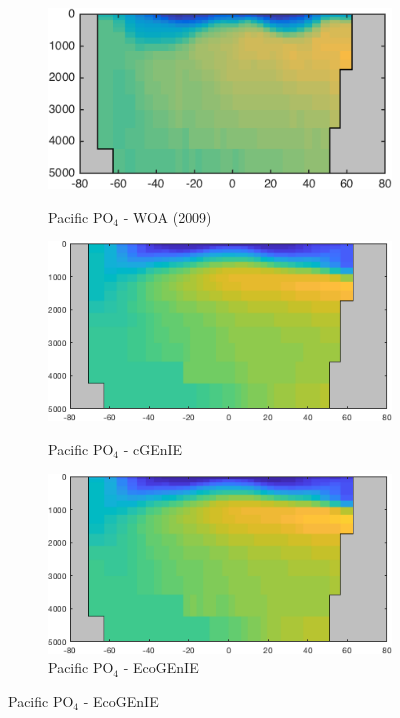 \documentclass{article}
\begin{document}
\begin{figure}[htp]
\begin{subfigure}{.33\textwidth}
 \label{fig:nutrients2}
\end{subfigure}
\begin{subfigure}{.33\textwidth}
 \caption{Pacific PO$_4$ - WOA (2009)}
 \includegraphics[width=0.95\linewidth]{../Separate_figures/OBSERVATIONS/Pacific_p_an_profile.png}
 \label{fig:nutrients1}
\end{subfigure}%
\begin{subfigure}{.33\textwidth}
 \caption{Pacific PO$_4$ - cGEnIE}
 \includegraphics[width=0.95\linewidth]{../Separate_figures/BIOGEM/Pacific_ocn_PO4_profile.png}
 \label{fig:nutrients1}
\end{subfigure}%
\begin{subfigure}{.33\textwidth}
 \caption{Pacific PO$_4$ - EcoGEnIE}
 \includegraphics[width=0.95\linewidth]{../Separate_figures/ECOGEM/Pacific_ocn_PO4_profile.png}

\end{subfigure}
\end{figure}
\end{document}
